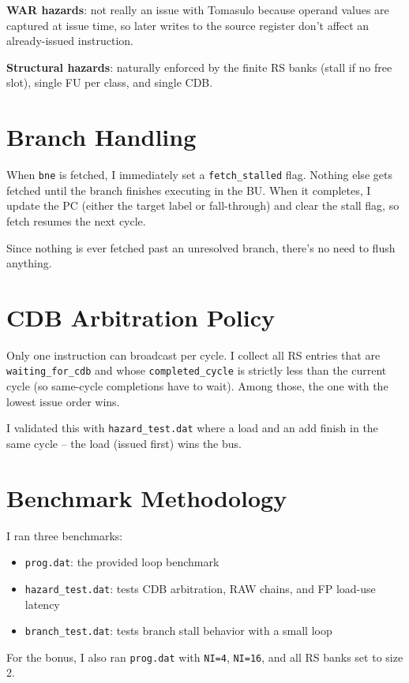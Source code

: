 \documentclass[11pt]{article}
\begin{document}
\textbf{WAR hazards}: not really an issue with Tomasulo because operand values are captured at issue time, so later writes to the source register don't affect an already-issued instruction.

\textbf{Structural hazards}: naturally enforced by the finite RS banks (stall if no free slot), single FU per class, and single CDB.

\section{Branch Handling}
When \texttt{bne} is fetched, I immediately set a \texttt{fetch\_stalled} flag. Nothing else gets fetched until the branch finishes executing in the BU. When it completes, I update the PC (either the target label or fall-through) and clear the stall flag, so fetch resumes the next cycle.

Since nothing is ever fetched past an unresolved branch, there's no need to flush anything.

\section{CDB Arbitration Policy}
Only one instruction can broadcast per cycle. I collect all RS entries that are \texttt{waiting\_for\_cdb} and whose \texttt{completed\_cycle} is strictly less than the current cycle (so same-cycle completions have to wait). Among those, the one with the lowest issue order wins.

I validated this with \texttt{hazard\_test.dat} where a load and an add finish in the same cycle -- the load (issued first) wins the bus.

\section{Benchmark Methodology}
I ran three benchmarks:

\begin{itemize}
\item \texttt{prog.dat}: the provided loop benchmark
\item \texttt{hazard\_test.dat}: tests CDB arbitration, RAW chains, and FP load-use latency
\item \texttt{branch\_test.dat}: tests branch stall behavior with a small loop
\end{itemize}

For the bonus, I also ran \texttt{prog.dat} with \texttt{NI=4}, \texttt{NI=16}, and all RS banks set to size 2.
\end{document}
